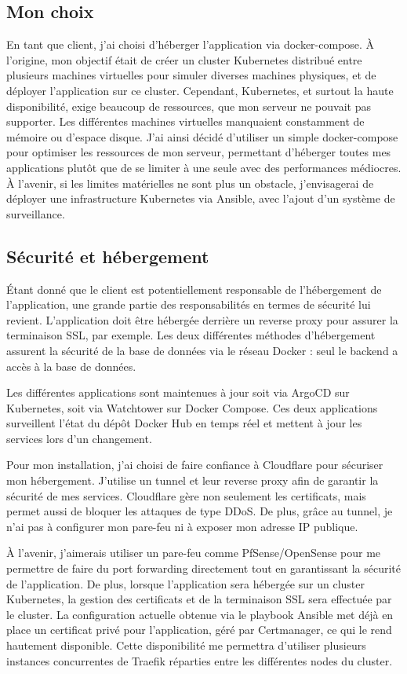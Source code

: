 \subsection{Mon choix}\label{subsec:mon-choix}
En tant que client, j'ai choisi d'héberger l'application via docker-compose.
À l'origine, mon objectif était de créer un cluster Kubernetes distribué entre plusieurs machines virtuelles pour simuler diverses machines physiques, et de déployer l'application sur ce cluster.
Cependant, Kubernetes, et surtout la haute disponibilité, exige beaucoup de ressources, que mon serveur ne pouvait pas supporter.
Les différentes machines virtuelles manquaient constamment de mémoire ou d'espace disque.
J'ai ainsi décidé d'utiliser un simple docker-compose pour optimiser les ressources de mon serveur, permettant d'héberger toutes mes applications plutôt que de se limiter à une seule avec des performances médiocres.
À l'avenir, si les limites matérielles ne sont plus un obstacle, j'envisagerai de déployer une infrastructure Kubernetes via Ansible, avec l'ajout d'un système de surveillance.

\subsection{Sécurité et hébergement}\label{subsec:securite-et-hebergement}
Étant donné que le client est potentiellement responsable de l'hébergement de l'application, une grande partie des responsabilités en termes de sécurité lui revient.
L'application doit être hébergée derrière un reverse proxy pour assurer la terminaison SSL, par exemple.
Les deux différentes méthodes d'hébergement assurent la sécurité de la base de données via le réseau Docker : seul le backend a accès à la base de données.

Les différentes applications sont maintenues à jour soit via ArgoCD sur Kubernetes, soit via Watchtower sur Docker Compose.
Ces deux applications surveillent l'état du dépôt Docker Hub en temps réel et mettent à jour les services lors d'un changement.

Pour mon installation, j'ai choisi de faire confiance à Cloudflare pour sécuriser mon hébergement.
J'utilise un tunnel et leur reverse proxy afin de garantir la sécurité de mes services.
Cloudflare gère non seulement les certificats, mais permet aussi de bloquer les attaques de type DDoS. De plus, grâce au tunnel, je n'ai pas à configurer mon pare-feu ni à exposer mon adresse IP publique.

À l'avenir, j'aimerais utiliser un pare-feu comme PfSense/OpenSense pour me permettre de faire du port forwarding directement tout en garantissant la sécurité de l'application.
De plus, lorsque l'application sera hébergée sur un cluster Kubernetes, la gestion des certificats et de la terminaison SSL sera effectuée par le cluster.
La configuration actuelle obtenue via le playbook Ansible met déjà en place un certificat privé pour l'application, géré par Certmanager, ce qui le rend hautement disponible.
Cette disponibilité me permettra d'utiliser plusieurs instances concurrentes de Traefik réparties entre les différentes nodes du cluster.

